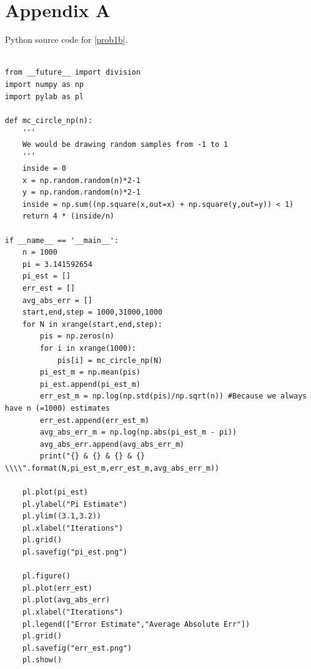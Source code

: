 \documentclass[a4paper,11pt]{article}
\begin{document}
\section{Appendix A}\label{code:problem1b}
Python source code for \ref{prob1b}.
{\footnotesize
\begin{lstlisting}

from __future__ import division
import numpy as np
import pylab as pl

def mc_circle_np(n):
    '''
    We would be drawing random samples from -1 to 1
    '''
    inside = 0
    x = np.random.random(n)*2-1
    y = np.random.random(n)*2-1
    inside = np.sum((np.square(x,out=x) + np.square(y,out=y)) < 1)
    return 4 * (inside/n)

if __name__ == '__main__':
    n = 1000
    pi = 3.141592654
    pi_est = []
    err_est = []
    avg_abs_err = []
    start,end,step = 1000,31000,1000
    for N in xrange(start,end,step):
        pis = np.zeros(n)
        for i in xrange(1000):
            pis[i] = mc_circle_np(N)
        pi_est_m = np.mean(pis)
        pi_est.append(pi_est_m)
        err_est_m = np.log(np.std(pis)/np.sqrt(n)) #Because we always have n (=1000) estimates
        err_est.append(err_est_m)
        avg_abs_err_m = np.log(np.abs(pi_est_m - pi))
        avg_abs_err.append(avg_abs_err_m)
        print("{} & {} & {} & {} \\\\".format(N,pi_est_m,err_est_m,avg_abs_err_m))

    pl.plot(pi_est)
    pl.ylabel("Pi Estimate")
    pl.ylim((3.1,3.2))
    pl.xlabel("Iterations")
    pl.grid()
    pl.savefig("pi_est.png")

    pl.figure()
    pl.plot(err_est)
    pl.plot(avg_abs_err)
    pl.xlabel("Iterations")
    pl.legend(["Error Estimate","Average Absolute Err"])
    pl.grid()
    pl.savefig("err_est.png")
    pl.show()

\end{lstlisting}
}
\clearpage
\end{document}
